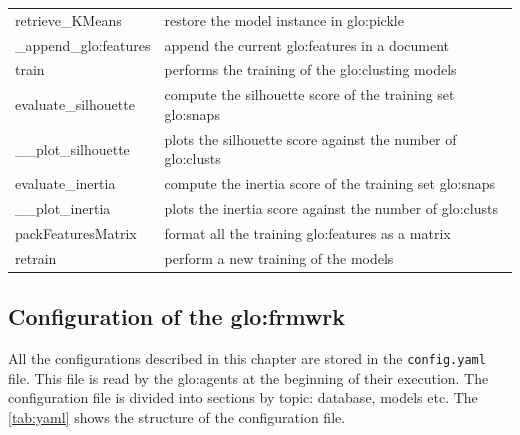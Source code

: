 \begin{longtable}{p{}p{}}
    retrieve\_KMeans & restore the model instance in \gls{glo:pickle}  \\
    \_append\_\gls{glo:feature}s & append the current \gls{glo:feature}s in a document \\
    train & performs the training of the \gls{glo:clust}ing models \\
    evaluate\_silhouette & compute the silhouette score of the training set \gls{glo:snap}s \\
    \_\_plot\_silhouette & plots the silhouette score against the number of \gls{glo:clust}s \\
    evaluate\_inertia & compute the inertia score of the training set \gls{glo:snap}s \\
    \_\_plot\_inertia & plots the inertia score against the number of \gls{glo:clust}s \\
    packFeaturesMatrix & format all the training \gls{glo:feature}s as a matrix \\
    retrain & perform a new training of the models \\
    \bottomrule
    \end{longtable}
    
\newpage
\subsection{Configuration of the \gls{glo:frmwrk}}
All the configurations described in this chapter are stored in the \texttt{config.yaml} file. This file is read by the \gls{glo:agent}s at the beginning of their execution. The configuration file is divided into sections by topic: database, models etc. The \autoref{tab:yaml} shows the structure of the configuration file.


